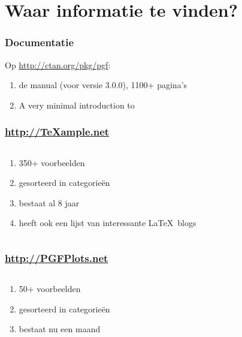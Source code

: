 \section{Waar informatie te vinden?}

\begin{frame}
  \frametitle{Documentatie}

  Op \url{http://ctan.org/pkg/pgf}:
  \begin{enumerate}
    \item de manual (voor versie 3.0.0), 1100+ pagina's
    \item A very minimal introduction to \TikZ
  \end{enumerate}
\end{frame}

\begin{frame}
  \frametitle{\url{http://TeXample.net}}

  \begin{columns}
    \begin{column}{.33\textwidth}
      \begin{enumerate}
        \item 350+ voorbeelden
        \item gesorteerd in categorie\"en
        \item bestaat al 8 jaar
        \item heeft ook een lijst van interessante \LaTeX\ blogs
      \end{enumerate}
    \end{column}

    \begin{column}{.66\textwidth}
      \begin{flushright}
        
      \end{flushright}
    \end{column}
  \end{columns}
\end{frame}

\begin{frame}
  \frametitle{\url{http://PGFPlots.net}}

  \begin{columns}
    \begin{column}{.4\textwidth}
      \begin{enumerate}
        \item 50+ voorbeelden
        \item gesorteerd in categorie\"en
        \item bestaat nu een maand
      \end{enumerate}
    \end{column}

    \begin{column}{.6\textwidth}
      \begin{flushright}
        
      \end{flushright}
    \end{column}
  \end{columns}
\end{frame}

